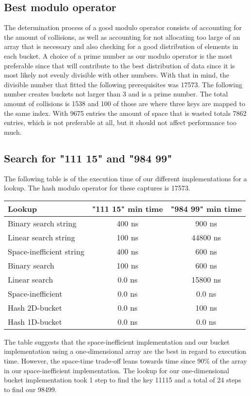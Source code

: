 \documentclass[a4paper,11pt]{article}
\begin{document}
    \subsection*{Best modulo operator}

        The determination process of a good modulo operator consists of accounting for the amount of collisions, as well as accounting for not allocating too large of an array that is necessary and also checking for a good distribution of elements in each bucket. A choice of a prime number as our modulo operator is the most preferable since that will contribute to the best distribution of data since it is most likely not evenly divisible with other numbers. With that in mind, the divisible number that fitted the following prerequisites was 17573. The following number creates buckets not larger than 3 and is a prime number. The total amount of collisions is 1538 and 100 of those are where three keys are mapped to the same index. With 9675 entries the amount of space that is wasted totals 7862 entries, which is not preferable at all, but it should not affect performance too much.

    \subsection*{Search for "111 15" and "984 99"}

        The following table is of the execution time of our different implementations for a lookup. The hash modulo operator for these captures is 17573.
        \begin{table}[h]
        \begin{center}
        \begin{tabular}{l|c|c}
        \textbf{Lookup} & \textbf{"111 15" min time} & \textbf{"984 99" min time} \\
        \hline
        Binary search string              & 400 ns & 900 ns\\
        Linear search string              & 100 ns & 44800 ns\\
        Space-inefficient string          & 400 ns & 600 ns\\
        Binary search                     & 100 ns & 600 ns\\
        Linear search                     & 0.0 ns & 15800 ns\\
        Space-inefficient                 & 0.0 ns & 0.0 ns\\
        Hash 2D-bucket                    & 0.0 ns & 100 ns\\
        Hash 1D-bucket                    & 0.0 ns & 0.0 ns\\
        \end{tabular}
        \end{center}
        \end{table}
        The table suggests that the space-inefficient implementation and our bucket implementation using a one-dimensional array are the best in regard to execution time. However, the space-time trade-off leans towards time since 90\% of the array in our space-inefficient implementation. The lookup for our one-dimensional bucket implementation took 1 step to find the key 11115 and a total of 24 steps to find our 98499. 
\end{document}
